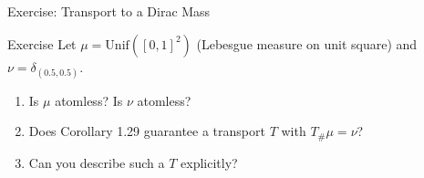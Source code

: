 \documentclass[aspectratio=169]{beamer}
\begin{document}
\begin{frame}{Exercise: Transport to a Dirac Mass}
\begin{block}{Exercise}
Let $\mu = \text{Unif}([0,1]^2)$ (Lebesgue measure on unit square) and $\nu = \delta_{(0.5, 0.5)}$.
\begin{enumerate}
    \item[(a)] Is $\mu$ atomless? Is $\nu$ atomless?
    \item[(b)] Does Corollary 1.29 guarantee a transport $T$ with $T_\# \mu = \nu$?
    \item[(c)] Can you describe such a $T$ explicitly?
\end{enumerate}
\end{block}

\begin{center}
\end{center}
\end{frame}
\end{document}
